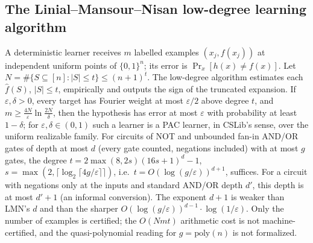 \begin{result}
\subsection{The Linial--Mansour--Nisan low-degree learning algorithm}
A deterministic learner receives $m$ labelled examples $(x_j,f(x_j))$ at independent uniform
points of $\{0,1\}^n$; its error is $\Pr_x[h(x)\ne f(x)]$. Let
$N=\#\{S\subseteq[n]:|S|\le t\}\le(n+1)^t$. The low-degree algorithm estimates each $\hat f(S)$,
$|S|\le t$, empirically and outputs the sign of the truncated expansion. If
$\varepsilon,\delta>0$, every target has Fourier weight at most $\varepsilon/2$ above degree $t$,
and $m\ge\frac{4N}{\varepsilon}\ln\frac{2N}{\delta}$, then the hypothesis has error at most
$\varepsilon$ with probability at least $1-\delta$; for $\varepsilon,\delta\in(0,1)$ such a learner is
a PAC learner, in CSLib's sense, over the uniform realizable family. For circuits of NOT and
unbounded fan-in AND/OR gates of depth at most $d$ (every gate counted, negations included) with
at most $g$ gates, the degree $t=2\max(8,2s)(16s+1)^d-1$,
$s=\max(2,\lceil\log_2\lceil4g/\varepsilon\rceil\rceil)$, i.e.\ $t=O(\log(g/\varepsilon))^{d+1}$,
suffices. For a circuit with negations only at the inputs and standard AND/OR depth $d'$, this
depth is at most $d'+1$ (an informal conversion). The exponent $d+1$ is weaker than LMN's $d$ and
than the sharper $O(\log(g/\varepsilon))^{d-1}\cdot\log(1/\varepsilon)$. Only the number of examples
is certified; the $O(Nmt)$ arithmetic cost is not machine-certified, and the quasi-polynomial
reading for $g=\mathrm{poly}(n)$ is not formalized.
\citep{LinialMansourNisan1993,ODonnell2014,Hoeffding1963,Valiant1984}
\end{result}

